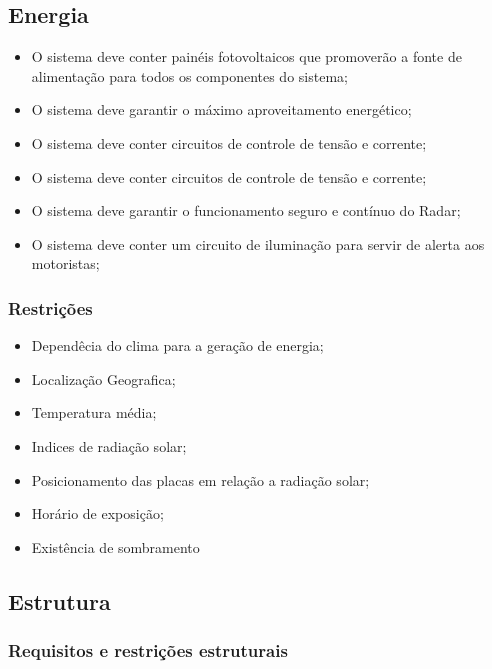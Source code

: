 \subsection{Energia}
\begin{itemize}
	\item O sistema deve conter painéis fotovoltaicos que promoverão a fonte de alimentação para todos os componentes do sistema;
	\item O sistema deve garantir o máximo aproveitamento energético;
	\item O sistema deve conter circuitos de controle de tensão e corrente;
	\item O sistema deve conter circuitos de controle de tensão e corrente;
	\item O sistema deve garantir o funcionamento seguro e contínuo do Radar;
	\item O sistema deve conter um circuito de iluminação para servir de alerta aos motoristas;

\end{itemize}

\subsubsection{Restrições}
\begin{itemize}
   \item Dependêcia do clima para a geração de energia;
   \item Localização Geografica;
   \item Temperatura média;
   \item Indices de radiação solar;
   \item Posicionamento das placas em relação a radiação solar;
   \item Horário de exposição;
   \item Existência de sombramento
 \end{itemize}
\subsection{Estrutura}

\subsubsection{Requisitos e restrições estruturais}

